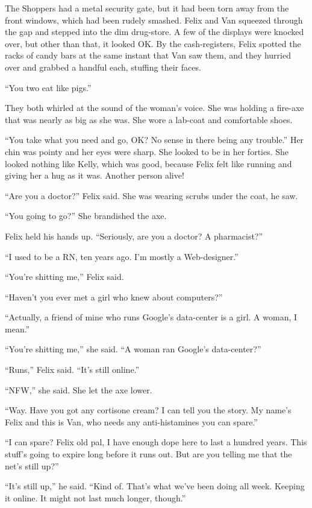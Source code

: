 The Shoppers had a metal security gate, but it had been torn away
from the front windows, which had been rudely smashed. Felix and
Van squeezed through the gap and stepped into the dim drug-store. A
few of the displays were knocked over, but other than that, it
looked OK. By the cash-registers, Felix spotted the racks of candy
bars at the same instant that Van saw them, and they hurried over
and grabbed a handful each, stuffing their faces.

“You two eat like pigs.”

They both whirled at the sound of the woman’s voice. She was
holding a fire-axe that was nearly as big as she was. She wore a
lab-coat and comfortable shoes.

“You take what you need and go, OK? No sense in there being any
trouble.” Her chin was pointy and her eyes were sharp. She looked
to be in her forties. She looked nothing like Kelly, which was
good, because Felix felt like running and giving her a hug as it
was. Another person alive!

“Are you a doctor?” Felix said. She was wearing scrubs under the
coat, he saw.

“You going to go?” She brandished the axe.

Felix held his hands up. “Seriously, are you a doctor? A
pharmacist?”

“I used to be a RN, ten years ago. I’m mostly a Web-designer.”

“You’re shitting me,” Felix said.

“Haven’t you ever met a girl who knew about computers?”

“Actually, a friend of mine who runs Google’s data-center is a
girl. A woman, I mean.”

“You’re shitting me,” she said. “A woman ran Google’s
data-center?”

“Runs,” Felix said. “It’s still online.”

“NFW,” she said. She let the axe lower.

“Way. Have you got any cortisone cream? I can tell you the story.
My name’s Felix and this is Van, who needs any anti-histamines you
can spare.”

“I can spare? Felix old pal, I have enough dope here to last a
hundred years. This stuff’s going to expire long before it runs
out. But are you telling me that the net’s still up?”

“It’s still up,” he said. “Kind of. That’s what we’ve been doing
all week. Keeping it online. It might not last much longer,
though.”


